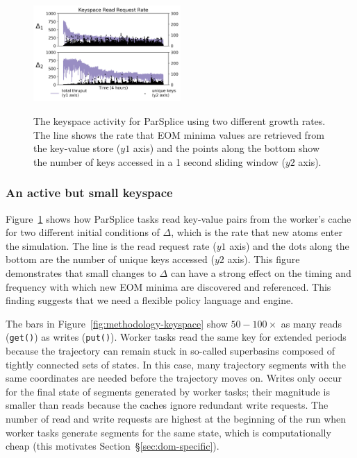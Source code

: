 \begin{figure}[t]
  \noindent\includegraphics[width=0.5\textwidth]{figures/motivation-regimes.png}\\
  \caption{The keyspace activity for ParSplice using two different growth
rates.  The line shows the rate that EOM minima values are retrieved from the
key-value store (\(y1\) axis) and the points along the bottom show the number
of keys accessed in a 1 second sliding window (\(y2\) axis).
\label{fig:motivation-regimes}}
\end{figure}

\subsubsection*{An active but small keyspace}
Figure~\ref{fig:motivation-regimes} shows how ParSplice tasks read key-value
pairs from the worker's cache for two different initial conditions of
\(\Delta\), which is the rate that new atoms enter the simulation.  The line is
the read request rate (\(y1\) axis) and the dots along the bottom are the
number of unique keys accessed (\(y2\) axis).  This figure demonstrates that
small changes to \(\Delta\) can have a strong effect on the timing and
frequency with which new EOM minima are discovered and referenced. This finding
suggests that we need a flexible policy language and engine. 

The bars in Figure~\ref{fig:methodology-keyspace} show \(50-100\times\) as many
reads (\texttt{get()}) as writes (\texttt{put()}).  Worker tasks read the same
key for extended periods because the trajectory can remain stuck in so-called
superbasins composed of tightly connected sets of states. In this case, many
trajectory segments with the same coordinates are needed before the trajectory
moves on.  Writes only occur for the final state of segments generated by
worker tasks; their magnitude is smaller than reads because the caches ignore
redundant write requests. The number of read and write requests are highest at
the beginning of the run when worker tasks generate segments for the same
state, which is computationally cheap (this motivates
Section~\S\ref{sec:dom-specific}).

